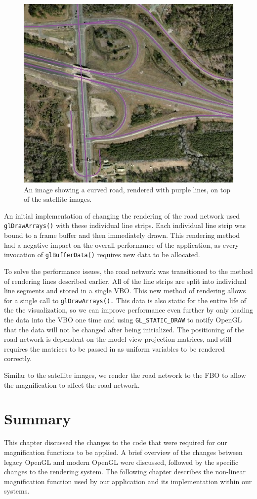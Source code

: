 \begin{figure}[htp] \centering
    \includegraphics[width=0.8\linewidth]{img/satellite_and_road.jpg}
    \caption[Satellite Images and Roads]{An image showing a curved road, rendered with purple lines, on top of the satellite images.}
    \label{fig:satellite_and_road}
\end{figure}

An initial implementation of changing the rendering of the road network used {\tt glDrawArrays()} with 
these individual line strips. Each individual line strip was bound to a frame buffer and then 
immediately drawn. This rendering method had a negative impact on the overall performance of 
the application, as every invocation of {\tt glBufferData()} requires new data to be allocated. 

To solve the performance issues, the road network was transitioned to the method of rendering 
lines described earlier. All of the line strips are split into individual 
line segments  and stored in a single VBO\@. This new method of rendering allows for a single call to 
{\tt glDrawArrays().} This data is also static for the entire life of the the visualization, so we can improve 
performance even further by only loading the data into the VBO one time and using {\tt GL\_STATIC\_DRAW} 
to notify OpenGL that the data will not be changed after being initialized. The positioning of the road 
network is dependent on the model view projection matrices, and still requires the matrices 
to be passed in as uniform variables to be rendered correctly.

Similar to the satellite images, we render the road network to the FBO to allow the magnification 
to affect the road network.

\section{Summary}
\label{section:methods_summary}

This chapter discussed the changes to the code that were required for our magnification functions to be applied. A brief overview of the changes between legacy OpenGL and modern OpenGL were discussed, followed by the specific changes to the rendering system. The following chapter describes the non-linear magnification function used by our application and its implementation within our systems.
